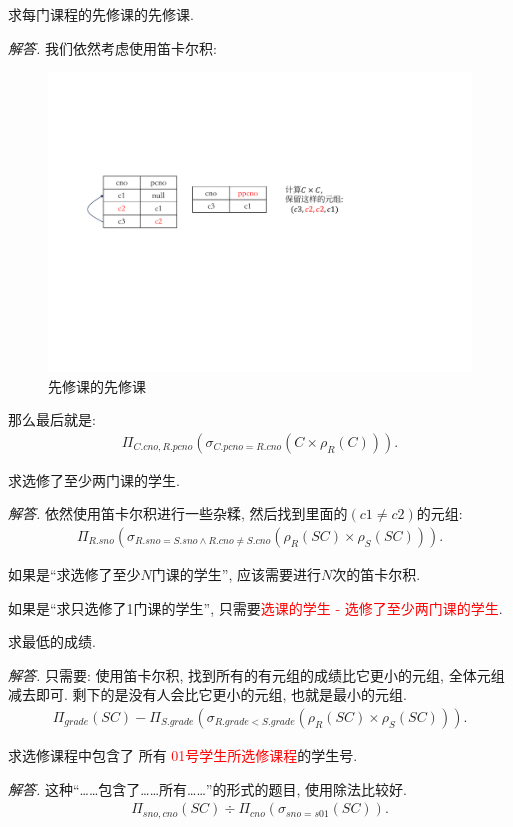\begin{problem}
    求每门课程的先修课的先修课.
\end{problem}
\textit{ 解答. }我们依然考虑使用笛卡尔积:
\begin{figure}[H]
    \centering
    \includegraphics[width=.7\textwidth]{figure/先修课.pdf}
    \caption{先修课的先修课}
\end{figure}
那么最后就是:
\begin{align*}
    \Pi_{C.cno,R.pcno}(\sigma_{C.pcno=R.cno}(C\times \rho_R(C))).
\end{align*}

\begin{problem}
    求选修了至少两门课的学生.
\end{problem}
\textit{ 解答. }依然使用笛卡尔积进行一些杂糅, 然后找到里面的$(c1\neq c2)$的元组:
\begin{align*}
    \Pi_{R.sno}(\sigma_{R.sno=S.sno\land R.cno\neq S.cno}(\rho_R(SC)\times \rho_S(SC))).
\end{align*}

\begin{remark}
    如果是“求选修了至少$N$门课的学生”, 应该需要进行$N$次的笛卡尔积.

    如果是“求只选修了1门课的学生”, 只需要\textcolor{red}{选课的学生 - 选修了至少两门课的学生}.
\end{remark}

\begin{problem}
    求最低的成绩.
\end{problem}
\textit{ 解答. }只需要: 使用笛卡尔积, 找到所有的有元组的成绩比它更小的元组, 全体元组减去即可. 剩下的是没有人会比它更小的元组, 也就是最小的元组.
\begin{align*}
    \Pi_{grade}(SC) - \Pi_{S.grade}(\sigma_{R.grade < S.grade}(\rho_R(SC)\times \rho_S(SC))).
\end{align*}

\begin{problem}
    求选修课程中包含了 所有 \textcolor{red}{01号学生所选修课程}的学生号.
\end{problem}
\textit{ 解答. }这种“……包含了……所有……”的形式的题目, 使用除法比较好.
\begin{align*}
    \Pi_{sno,cno}(SC) \div \Pi_{cno}(\sigma_{sno=s01}(SC)).
\end{align*}

